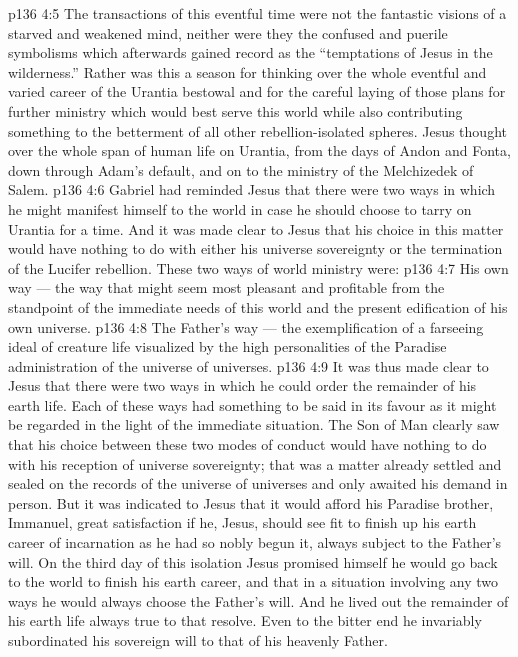 \vs p136 4:5 The transactions of this eventful time were not the fantastic visions of a starved and weakened mind, neither were they the confused and puerile symbolisms which afterwards gained record as the “temptations of Jesus in the wilderness.” Rather was this a season for thinking over the whole eventful and varied career of the Urantia bestowal and for the careful laying of those plans for further ministry which would best serve this world while also contributing something to the betterment of all other rebellion\hyp{}isolated spheres. Jesus thought over the whole span of human life on Urantia, from the days of Andon and Fonta, down through Adam’s default, and on to the ministry of the Melchizedek of Salem.
\vs p136 4:6 Gabriel had reminded Jesus that there were two ways in which he might manifest himself to the world in case he should choose to tarry on Urantia for a time. And it was made clear to Jesus that his choice in this matter would have nothing to do with either his universe sovereignty or the termination of the Lucifer rebellion. These two ways of world ministry were:
\vs p136 4:7 \bibnobreakspace His own way --- the way that might seem most pleasant and profitable from the standpoint of the immediate needs of this world and the present edification of his own universe.
\vs p136 4:8 \bibnobreakspace The Father’s way --- the exemplification of a farseeing ideal of creature life visualized by the high personalities of the Paradise administration of the universe of universes.
\vs p136 4:9 It was thus made clear to Jesus that there were two ways in which he could order the remainder of his earth life. Each of these ways had something to be said in its favour as it might be regarded in the light of the immediate situation. The Son of Man clearly saw that his choice between these two modes of conduct would have nothing to do with his reception of universe sovereignty; that was a matter already settled and sealed on the records of the universe of universes and only awaited his demand in person. But it was indicated to Jesus that it would afford his Paradise brother, Immanuel, great satisfaction if he, Jesus, should see fit to finish up his earth career of incarnation as he had so nobly begun it, always subject to the Father’s will. On the third day of this isolation Jesus promised himself he would go back to the world to finish his earth career, and that in a situation involving any two ways he would always choose the Father’s will. And he lived out the remainder of his earth life always true to that resolve. Even to the bitter end he invariably subordinated his sovereign will to that of his heavenly Father.
